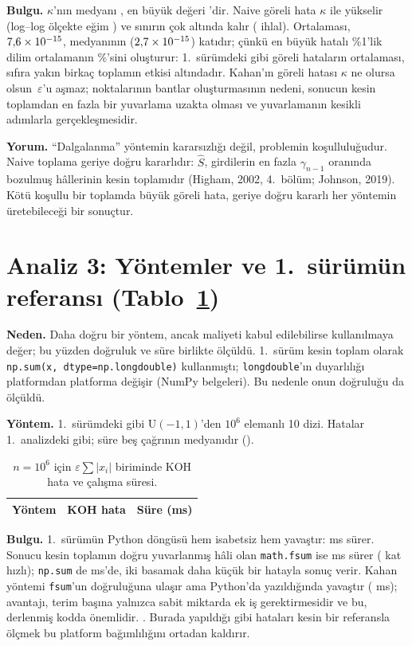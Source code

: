 \documentclass[11pt,a4paper]{article}
\begin{document}
\textbf{Bulgu.} $\kappa$'nın medyanı \KappaMedian{}, en büyük değeri \KappaMax{}'dir. Naive göreli hata $\kappa$ ile
yükselir (log--log ölçekte eğim \CondSlope{}) ve sınırın çok altında kalır (\BoundViolations{} ihlal). Ortalaması,
$7{,}6\times 10^{-15}$, medyanının ($2{,}7\times 10^{-15}$) \MeanOverMedian{} katıdır; çünkü en büyük hatalı \%1'lik dilim ortalamanın
\%\TopShare'sini oluşturur: 1.\ sürümdeki gibi göreli hataların ortalaması, sıfıra yakın birkaç toplamın etkisi altındadır.
Kahan'ın göreli hatası $\kappa$ ne olursa olsun \KahanMaxEps{}$\,\varepsilon$'u aşmaz; noktalarının bantlar oluşturmasının
nedeni, sonucun kesin toplamdan en fazla bir yuvarlama uzakta olması ve yuvarlamanın kesikli adımlarla gerçekleşmesidir.

\textbf{Yorum.} ``Dalgalanma'' yöntemin kararsızlığı değil, problemin koşulluluğudur. Naive toplama geriye doğru
kararlıdır: $\hat S$, girdilerin en fazla $\gamma_{n-1}$ oranında bozulmuş hâllerinin kesin toplamıdır (Higham, 2002,
4.\ bölüm; Johnson, 2019). Kötü koşullu bir toplamda büyük göreli hata, geriye doğru kararlı her yöntemin üretebileceği bir
sonuçtur.

\section{Analiz 3: Yöntemler ve 1.\ sürümün referansı (Tablo~\ref{tab:yontem})}

\textbf{Neden.} Daha doğru bir yöntem, ancak maliyeti kabul edilebilirse kullanılmaya değer; bu yüzden doğruluk ve süre birlikte
ölçüldü. 1.\ sürüm kesin toplam olarak { \texttt{np.sum(x, dtype=np.longdouble)}} kullanmıştı; \texttt{longdouble}'ın duyarlılığı
platformdan platforma değişir (NumPy belgeleri). Bu nedenle onun doğruluğu da ölçüldü.

\textbf{Yöntem.} 1.\ sürümdeki gibi $\mathrm{U}(-1,1)$'den $10^6$ elemanlı 10 dizi. Hatalar 1.\ analizdeki gibi; süre beş
çağrının medyanıdır (\Machine).

\begin{table}[h]
\centering\footnotesize
\caption{$n = 10^6$ için $\varepsilon\sum|x_i|$ biriminde KOH hata ve çalışma süresi.}\label{tab:yontem}
\begin{tabular}{lrr}
\toprule
Yöntem & KOH hata & Süre (ms) \\
\midrule

\end{tabular}
\end{table}

\textbf{Bulgu.} 1.\ sürümün Python döngüsü hem isabetsiz hem yavaştır: \TimeLoop{} ms sürer. Sonucu kesin toplamın doğru
yuvarlanmış hâli olan \texttt{math.fsum} ise \TimeFsum{} ms sürer (\LoopOverFsum{} kat hızlı); \texttt{np.sum} de \TimeNpSum{}
ms'de, iki basamak daha küçük bir hatayla sonuç verir. Kahan yöntemi \texttt{fsum}'un doğruluğuna ulaşır ama Python'da
yazıldığında yavaştır (\TimeKahan{} ms); avantajı, terim başına yalnızca sabit miktarda ek iş gerektirmesidir ve bu, derlenmiş
kodda önemlidir. \LongdoubleSentence. Burada yapıldığı gibi hataları kesin bir referansla ölçmek bu platform bağımlılığını
ortadan kaldırır.
\end{document}
